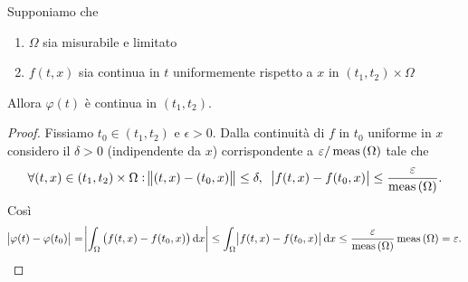 \begin{thm}
	Supponiamo che 
	\begin{enumerate}[label = (\roman*)]
		\item $ \Omega $ sia misurabile e limitato
		\item $ f(t, x) $ sia continua in $ t $ uniformemente rispetto a $ x $ in $ (t_1, t_2) \times \Omega $
	\end{enumerate}
	Allora $ \varphi(t) $ è continua in $ (t_1, t_2) $.
\end{thm}
%
\begin{proof}
	Fissiamo $ t_0 \in (t_1, t_2) $ e $ \epsilon > 0 $. Dalla continuità di $ f $ in $ t_0 $ uniforme in $ x $ considero il $ \delta > 0 $ (indipendente da $ x $) corrispondente a $ \varepsilon / \operatorname{meas}{(\Omega)} $ tale che
	\[
		\forall (t, x) \in (t_1, t_2) \times \Omega : \norm{(t, x) - (t_0, x)} \leq \delta, \ \  \abs{f(t, x) - f(t_0, x)} \leq \frac{\varepsilon}{\operatorname{meas}{(\Omega)}}.
	\]
	Così
	\[
		\abs{\varphi(t) - \varphi(t_0)} = \abs{\int_{\Omega} \left(f(t, x) - f(t_0, x)\right) \dif{x}} \leq \int_{\Omega} \abs{f(t, x) - f(t_0, x)} \dif{x} \leq \frac{\epsilon}{\meas{(\Omega)}} \meas{(\Omega)} = \epsilon. \qedhere
	\]
\end{proof}

